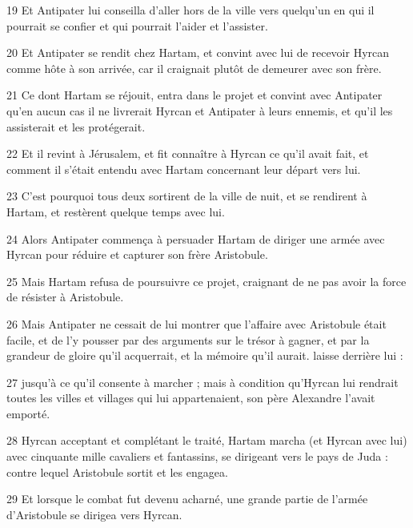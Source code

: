\par 19 Et Antipater lui conseilla d'aller hors de la ville vers quelqu'un en qui il pourrait se confier et qui pourrait l'aider et l'assister.

\par 20 Et Antipater se rendit chez Hartam, et convint avec lui de recevoir Hyrcan comme hôte à son arrivée, car il craignait plutôt de demeurer avec son frère.

\par 21 Ce dont Hartam se réjouit, entra dans le projet et convint avec Antipater qu'en aucun cas il ne livrerait Hyrcan et Antipater à leurs ennemis, et qu'il les assisterait et les protégerait.

\par 22 Et il revint à Jérusalem, et fit connaître à Hyrcan ce qu'il avait fait, et comment il s'était entendu avec Hartam concernant leur départ vers lui.

\par 23 C'est pourquoi tous deux sortirent de la ville de nuit, et se rendirent à Hartam, et restèrent quelque temps avec lui.

\par 24 Alors Antipater commença à persuader Hartam de diriger une armée avec Hyrcan pour réduire et capturer son frère Aristobule.

\par 25 Mais Hartam refusa de poursuivre ce projet, craignant de ne pas avoir la force de résister à Aristobule.

\par 26 Mais Antipater ne cessait de lui montrer que l'affaire avec Aristobule était facile, et de l'y pousser par des arguments sur le trésor à gagner, et par la grandeur de gloire qu'il acquerrait, et la mémoire qu'il aurait. laisse derrière lui :

\par 27 jusqu'à ce qu'il consente à marcher ; mais à condition qu'Hyrcan lui rendrait toutes les villes et villages qui lui appartenaient, son père Alexandre l'avait emporté.

\par 28 Hyrcan acceptant et complétant le traité, Hartam marcha (et Hyrcan avec lui) avec cinquante mille cavaliers et fantassins, se dirigeant vers le pays de Juda : contre lequel Aristobule sortit et les engagea.

\par 29 Et lorsque le combat fut devenu acharné, une grande partie de l'armée d'Aristobule se dirigea vers Hyrcan.


